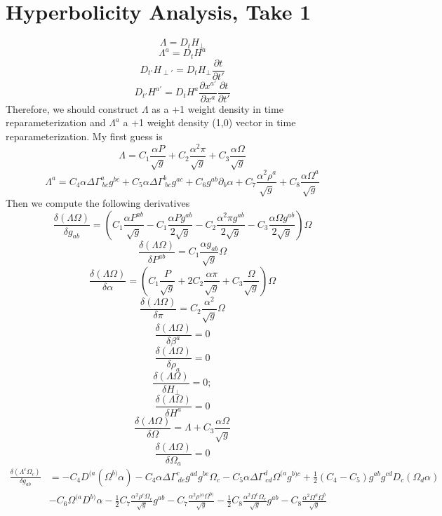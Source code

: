\documentclass{article}
\begin{document}
\section{Hyperbolicity Analysis, Take 1}
\[
\Lambda = D_{t}H_{\perp}
\]
\[
\Lambda^{a} = D_{t}H^{a}
\]
\[
D_{t'}H_{\perp'} = D_{t}H_{\perp}\frac{\partial t}{\partial t'}
\]
\[
D_{t'}H^{a'} = D_{t}H^{a}\frac{\partial x^{a'}}{\partial x^{a}}\frac{\partial t}{\partial t'}
\]
Therefore, we should construct $\Lambda$ as a +1 weight density in time reparameterization and $\Lambda^{a}$ a +1 weight density (1,0) vector in time reparameterization. My first guess is
\[
\Lambda = C_{1}\frac{\alpha P}{\sqrt{g}} + C_{2}\frac{\alpha^{2}\pi}{\sqrt{g}} + C_{3}\frac{\alpha \Omega}{\sqrt{g}}
\]
\[
\Lambda^{a} = C_{4}\alpha \Delta \Gamma^{a}_{~bc}g^{bc} + C_{5}\alpha \Delta \Gamma^{b}_{~bc}g^{ac} + C_{6}g^{ab}\partial_{b}\alpha + C_{7}\frac{\alpha^{2}\rho^{a}}{\sqrt{g}} + C_{8}\frac{\alpha \Omega^{a}}{\sqrt{g}}
\]
Then we compute the following derivatives
\[
\frac{\delta (\Lambda \Omega)}{\delta g_{ab}} = \left(C_{1}\frac{\alpha P^{ab}}{\sqrt{g}} - C_{1}\frac{\alpha P g^{ab}}{2\sqrt{g}} - C_{2}\frac{\alpha^{2} \pi g^{ab}}{2\sqrt{g}} - C_{3}\frac{\alpha \Omega g^{ab}}{2\sqrt{g}}\right)\Omega
\]
\[
\frac{\delta (\Lambda \Omega)}{\delta P^{ab}} = C_{1}\frac{\alpha g_{ab}}{\sqrt{g}}\Omega
\]
\[
\frac{\delta (\Lambda \Omega)}{\delta \alpha} = \left(C_{1}\frac{P}{\sqrt{g}} + 2C_{2}\frac{\alpha \pi}{\sqrt{g}} + C_{3}\frac{\Omega}{\sqrt{g}}\right)\Omega
\]
\[
\frac{\delta (\Lambda \Omega) }{\delta \pi} = C_{2}\frac{\alpha^{2}}{\sqrt{g}}\Omega
\]
\[
\frac{\delta (\Lambda \Omega)}{\delta \beta^{a}} = 0
\]
\[
\frac{\delta (\Lambda \Omega)}{\delta \rho_{a}} = 0
\]
\[
\frac{\delta (\Lambda \Omega)}{\delta H_{\perp}} = 0;
\]
\[
\frac{\delta (\Lambda \Omega)}{\delta H^{a}} = 0
\]
\[
\frac{\delta (\Lambda \Omega)}{\delta \Omega} = \Lambda + C_{3}\frac{\alpha \Omega}{\sqrt{g}}
\]
\[
\frac{\delta (\Lambda \Omega)}{\delta \Omega_{a}} = 0
\]
\begin{align*}
\frac{\delta (\Lambda^{c}\Omega_{c})}{\delta g_{ab}} & = -C_{4}D^{(a}\left(\Omega^{b)}\alpha\right) - C_{4}\alpha \Delta \Gamma^{c}_{~de}g^{ad}g^{be}\Omega_{c} - C_{5}\alpha \Delta \Gamma^{d}_{~cd}\Omega^{(a}g^{b)c} + \frac{1}{2}\left(C_{4} - C_{5}\right)g^{ab}g^{cd}D_{c}\left(\Omega_{d}\alpha\right)\\
& - C_{6} \Omega^{(a}D^{b)}\alpha - \frac{1}{2}C_{7} \frac{\alpha^{2}\rho^{c}\Omega_{c}}{\sqrt{g}}g^{ab} - C_{7}\frac{\alpha^{2}\rho^{(a}\Omega^{b)}}{\sqrt{g}} - \frac{1}{2}C_{8}\frac{\alpha^{2}\Omega^{c}\Omega_{c}}{\sqrt{g}}g^{ab} - C_{8}\frac{\alpha^{2}\Omega^{a}\Omega^{b}}{\sqrt{g}}
\end{align*}
\end{document}
